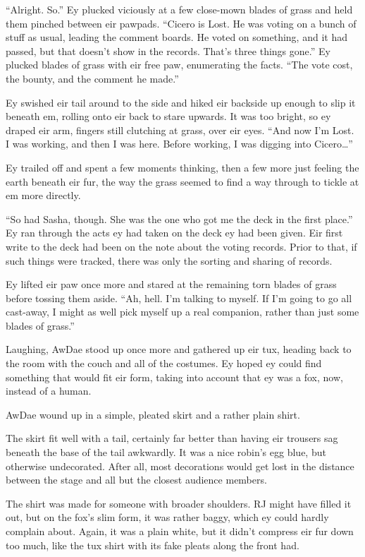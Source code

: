 ``Alright. So.'' Ey plucked viciously at a few close-mown blades of grass and held them pinched between eir pawpads. ``Cicero is Lost. He was voting on a bunch of stuff as usual, leading the comment boards. He voted on something, and it had passed, but that doesn't show in the records. That's three things gone.'' Ey plucked blades of grass with eir free paw, enumerating the facts. ``The vote cost, the bounty, and the comment he made.''

Ey swished eir tail around to the side and hiked eir backside up enough to slip it beneath em, rolling onto eir back to stare upwards. It was too bright, so ey draped eir arm, fingers still clutching at grass, over eir eyes. ``And now I'm Lost. I was working, and then I was here. Before working, I was digging into Cicero\ldots{}''

Ey trailed off and spent a few moments thinking, then a few more just feeling the earth beneath eir fur, the way the grass seemed to find a way through to tickle at em more directly.

``So had Sasha, though. She was the one who got me the deck in the first place.'' Ey ran through the acts ey had taken on the deck ey had been given. Eir first write to the deck had been on the note about the voting records. Prior to that, if such things were tracked, there was only the sorting and sharing of records.

Ey lifted eir paw once more and stared at the remaining torn blades of grass before tossing them aside. ``Ah, hell. I'm talking to myself. If I'm going to go all cast-away, I might as well pick myself up a real companion, rather than just some blades of grass.''

Laughing, AwDae stood up once more and gathered up eir tux, heading back to the room with the couch and all of the costumes. Ey hoped ey could find something that would fit eir form, taking into account that ey was a fox, now, instead of a human.

AwDae wound up in a simple, pleated skirt and a rather plain shirt.

The skirt fit well with a tail, certainly far better than having eir trousers sag beneath the base of the tail awkwardly. It was a nice robin's egg blue, but otherwise undecorated. After all, most decorations would get lost in the distance between the stage and all but the closest audience members.

The shirt was made for someone with broader shoulders. RJ might have filled it out, but on the fox's slim form, it was rather baggy, which ey could hardly complain about. Again, it was a plain white, but it didn't compress eir fur down too much, like the tux shirt with its fake pleats along the front had.

